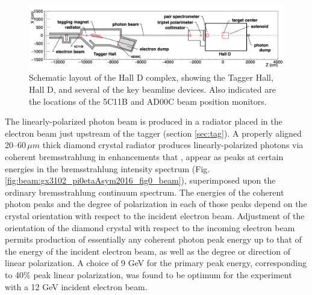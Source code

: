 
\begin{figure}[t]
\begin{center}
 \includegraphics[clip=true,width=0.98\linewidth]{figures/Draw_beamline.png}
\end{center}
\caption{Schematic layout of the Hall D complex, showing the Tagger Hall, Hall D, and
several of the key beamline devices.
Also indicated are the locations of the 5C11B and AD00C beam position monitors.
        }
\label{fig:beam:Draw_beamline} 
\end{figure}

The linearly-polarized photon beam is produced in a radiator placed in the electron beam just upstream of the
tagger (section \ref{sec:tag}). A properly aligned 20--60\,$\mu m$ thick diamond crystal
radiator produces
linearly-polarized photons via coherent brems\-strah\-lung in enhancements that \cite{timm1969,LIVINGSTON2009205},
appear as peaks at certain energies in the brems\-strah\-lung intensity spectrum (Fig.\,\ref{fig:beam:gx3102_pi0etaAsym2016_fig0_beam}), superimposed upon the ordinary brems\-strah\-lung
continuum spectrum.
The energies of the coherent photon peaks and the degree of polarization in each of those peaks depend on the crystal orientation with respect to the incident electron beam.
Adjustment of the orientation of the diamond crystal with respect to the incoming
electron beam permits production of essentially any coherent photon peak energy up to that of the energy of the incident electron beam, as well as the
degree or direction of linear polarization.
A choice of 9 GeV for the primary peak energy, corresponding to 40\% peak linear polarization,
was found to be optimum for the \GX{} experiment with a 12 GeV incident electron beam.

